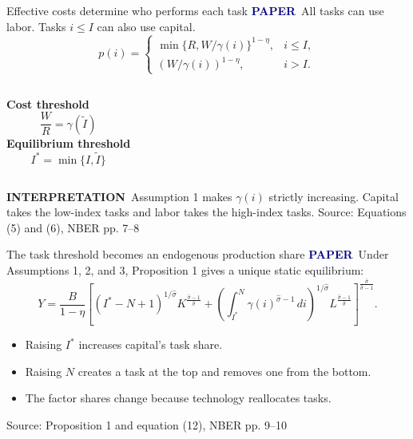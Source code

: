 \documentclass[aspectratio=169,11pt]{beamer}
\newcommand{\source}[1]{\vfill{\tiny\color{muted}Source: #1}}
\newcommand{\paper}{\textcolor{navy}{\textbf{PAPER}}}
\newcommand{\interpretation}{\textcolor{muted}{\textbf{INTERPRETATION}}}
\begin{document}
\begin{frame}{Effective costs determine who performs each task}
  \paper\ All tasks can use labor. Tasks $i\le I$ can also use capital.
  \[
    p(i)=
    \begin{cases}
      \min\{R,W/\gamma(i)\}^{1-\eta}, & i\le I,\\[2mm]
      (W/\gamma(i))^{1-\eta}, & i>I.
    \end{cases}
  \]

  \begin{columns}[T,onlytextwidth]
    \textbf{Cost threshold}
    \[
      \frac{W}{R}=\gamma(\widetilde I)
    \]
    \textbf{Equilibrium threshold}
    \[
      I^*=\min\{I,\widetilde I\}
    \]
  \end{columns}

  \interpretation\ Assumption 1 makes $\gamma(i)$ strictly increasing. Capital takes the low-index tasks and labor takes the high-index tasks.
  \source{Equations (5) and (6), NBER pp. 7--8}
\end{frame}

\begin{frame}{The task threshold becomes an endogenous production share}
  \paper\ Under Assumptions 1, 2, and 3, Proposition 1 gives a unique static equilibrium:
  \[
    Y=\frac{B}{1-\eta}
    \left[
      (I^*-N+1)^{1/\widehat\sigma}K^{\frac{\widehat\sigma-1}{\widehat\sigma}}
      +
      \left(\int_{I^*}^{N}\gamma(i)^{\widehat\sigma-1}\,di\right)^{1/\widehat\sigma}
      L^{\frac{\widehat\sigma-1}{\widehat\sigma}}
    \right]^{\frac{\widehat\sigma}{\widehat\sigma-1}}.
  \]

  \begin{itemize}
    \item Raising $I^*$ increases capital's task share.
    \item Raising $N$ creates a task at the top and removes one from the bottom.
    \item The factor shares change because technology reallocates tasks.
  \end{itemize}
  \source{Proposition 1 and equation (12), NBER pp. 9--10}
\end{frame}
\end{document}
